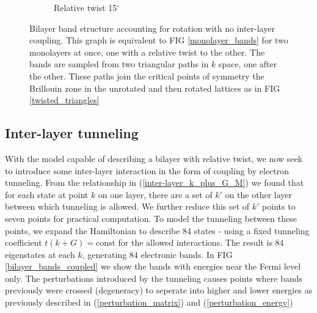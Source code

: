 \documentclass[12pt]{report} %
\begin{document}
\begin{figure}[t!]
\begin{subfigure}[t]{0.45\textwidth}
    \caption{
      Relative twist 15$^\circ$
    }
    \label{bilayer_bands_15}
  \end{subfigure}
  \caption{
    Bilayer band structure accounting for rotation with no inter-layer coupling. This graph is equivalent to FIG \ref{monolayer_bands} for two monolayers at once, one with a relative twist to the other. The bands are sampled from two triangular paths in $k$ space, one after the other. These paths join the critical points of symmetry the Brillouin zone in the unrotated and then rotated lattices as in FIG \ref{twisted_triangles}
  }
  \label{bilayer_bands}
\end{figure}

\subsection*{Inter-layer tunneling}
With the model capable of describing a bilayer with relative twist, we now seek to introduce some inter-layer interaction in the form of coupling by electron tunneling. From the relationship in (\ref{inter-layer_k_plus_G_M}) we found that for each state at point $k$ on one layer, there are a set of $k'$ on the other layer between which tunneling is allowed. We further reduce this set of $k'$ points to seven points for practical computation. To model the tunneling between these points, we expand the Hamiltonian to describe 84 states - using a fixed tunneling coefficient $t(k + G) = \text{const}$ for the allowed interactions. The result is 84 eigenstates at each $k$, generating 84 electronic bands. In FIG \ref{bilayer_bands_coupled} we show the bands with energies near the Fermi level only. The perturbations introduced by the tunneling causes points where bands previously were crossed (degeneracy) to seperate into higher and lower energies as previously described in (\ref{perturbation_matrix}) and (\ref{perturbation_energy})
\end{document}

